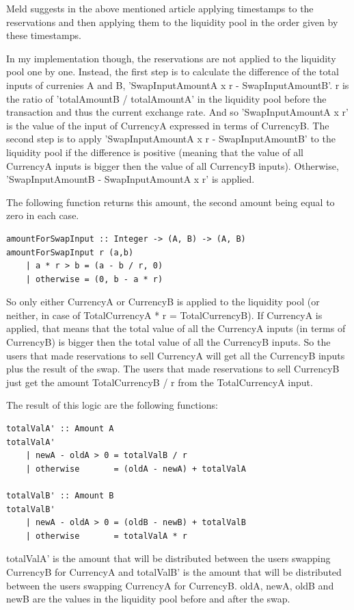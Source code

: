\documentclass[a4paper,twoside,12pt]{report}
\begin{document}
\begin{itemize}
Meld suggests in the above mentioned  article \cite{meldConcurrencySolution} applying timestamps to the reservations and then applying them to the liquidity pool in the order given by these timestamps.

In my implementation though, the reservations are not applied to the liquidity pool one by one. Instead, the first step is to calculate the difference of the total inputs of currenies A and B, 'SwapInputAmountA x r - SwapInputAmountB'. r is the ratio of 'totalAmountB / totalAmountA' in the liquidity pool before the transaction and thus the current exchange rate. And so 'SwapInputAmountA x r' is the value of the input of CurrencyA expressed in terms of CurrencyB. 
The second step is to apply 'SwapInputAmountA x r - SwapInputAmountB' to the liquidity pool if the difference is positive (meaning that the value of all CurrencyA inputs is bigger then the value of all CurrencyB inputs). Otherwise, 'SwapInputAmountB - SwapInputAmountA x r' is applied.

The following function returns this amount, the second amount being equal to zero in each case. 
\begin{verbatim}
amountForSwapInput :: Integer -> (A, B) -> (A, B)
amountForSwapInput r (a,b)
    | a * r > b = (a - b / r, 0)
    | otherwise = (0, b - a * r)
\end{verbatim}

So only either CurrencyA or CurrencyB is applied to the liquidity pool (or neither, in case of TotalCurrencyA * r = TotalCurrencyB). If CurrencyA is applied, that means that the total value of all the CurrencyA inputs (in terms of CurrencyB) is bigger then the total value of all the CurrencyB inputs. So the users that made reservations to sell CurrencyA will get all the CurrencyB inputs plus the result of the swap. The users that made reservations to sell CurrencyB just get the amount TotalCurrencyB / r from the TotalCurrencyA input.

The result of this logic are the following functions: 

\begin{verbatim}
totalValA' :: Amount A
totalValA'
    | newA - oldA > 0 = totalValB / r
    | otherwise       = (oldA - newA) + totalValA 

totalValB' :: Amount B
totalValB'
    | newA - oldA > 0 = (oldB - newB) + totalValB
    | otherwise       = totalValA * r 
\end{verbatim}

totalValA' is the amount that will be distributed between the users swapping CurrencyB for CurrencyA and totalValB' is the amount that will be distributed between the users swapping CurrencyA for CurrencyB. oldA, newA, oldB and newB are the values in the liquidity pool before and after the swap. 


\end{itemize}
\end{document}

